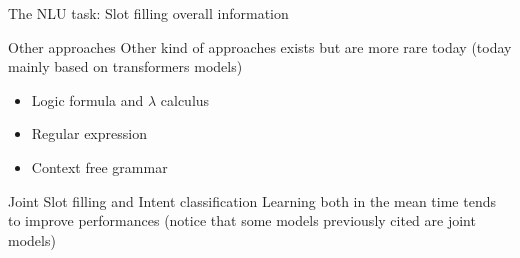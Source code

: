 \documentclass[10pt,aspectratio=169]{beamer}
\begin{document}
\begin{frame}{The NLU task: Slot filling overall information}
    \begin{block}{Other approaches}
        Other kind of approaches exists but are  more rare today (today mainly based on transformers models)
        \begin{itemize}
            \item Logic formula and $\lambda$ calculus \cite{antoine-2004-categorial}
            \item Regular expression \cite{llanos-etal-2016-managing}
            \item Context free grammar \cite{GLASS19951}
        \end{itemize}
    \end{block}

    \begin{block}{Joint Slot filling and Intent classification}
        Learning both in the mean time tends to improve performances (notice that some models previously cited are joint models)
    \end{block}

\end{frame}
\end{document}
